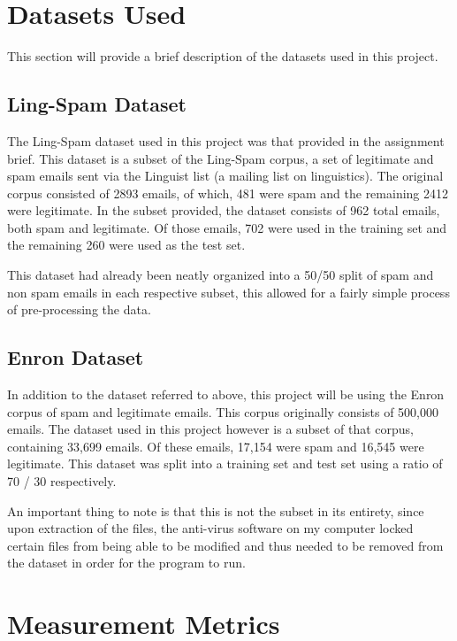 \documentclass[11pt, a4paper]{article}
\begin{document}
\section{Datasets Used} 

This section will provide a brief description of the datasets used in this project.

\subsection{Ling-Spam Dataset} 

The Ling-Spam dataset used in this project was that provided in the assignment brief. This dataset is a subset of the Ling-Spam corpus, a set of legitimate and spam emails sent via the Linguist list (a mailing list on linguistics). The original corpus consisted of 2893 emails, of which, 481 were spam and the remaining 2412 were legitimate. In the subset provided, the dataset consists of 962 total emails, both spam and legitimate. Of those emails, 702 were used in the training set and the remaining 260 were used as the test set. 

This dataset had already been neatly organized into a 50/50 split of spam and non spam emails in each respective subset, this allowed for a fairly simple process of pre-processing the data.

\subsection{Enron Dataset}

In addition to the dataset referred to above, this project will be using the Enron corpus of spam and legitimate emails. This corpus originally consists of 500,000 emails. The dataset used in this project however is a subset of that corpus, containing 33,699 emails. Of these emails, 17,154 were spam and 16,545 were legitimate. This dataset was split into a training set and test set using a ratio of 70 / 30 respectively.

An important thing to note is that this is not the subset in its entirety, since upon extraction of the files, the anti-virus software on my computer locked certain files from being able to be modified and thus needed to be removed from the dataset in order for the program to run.

\section{Measurement Metrics}
\end{document}

